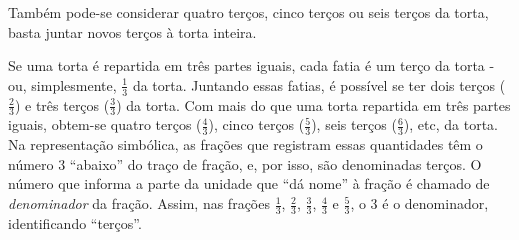\documentclass[a4,12pt]{book}
\begin{document}
  
Também pode-se considerar quatro terços, cinco terços ou seis terços da torta, basta juntar novos terços à torta inteira.

\begin{center}
\vspace{0.4cm}

\vspace{0.4cm}

\end{center}

Se uma torta é repartida em três partes iguais, cada fatia é um terço da torta - ou, simplesmente, $\frac{1}{3}$ da torta. Juntando essas fatias, é possível se ter dois terços ($\frac{2}{3}$) e três terços ($\frac{3}{3}$) da torta. Com mais do que uma torta repartida em três partes iguais, obtem-se quatro terços ($\frac{4}{3}$), cinco terços ($\frac{5}{3}$), seis terços ($\frac{6}{3}$), etc, da torta. Na representação simbólica, as frações que registram essas quantidades têm o número 3 ``abaixo'' do traço de fração, e, por isso, são denominadas terços. O número que informa a parte da unidade que ``dá nome'' à fração é chamado de {\it denominador} da fração. Assim, nas frações $\frac{1}{3}$, $\frac{2}{3}$, $\frac{3}{3}$,  $\frac{4}{3}$ e $\frac{5}{3}$, o 3 é o denominador, identificando ``terços''. 
\end{document}
